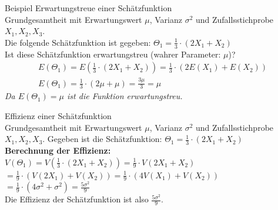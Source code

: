 \begin{example2}{Beispiel Erwartungstreue einer Schätzfunktion}\\
Grundgesamtheit mit Erwartungswert $\mu$, Varianz $\sigma^2$ und Zufallsstichprobe $X_1, X_2, X_3$. \\Die folgende Schätzfunktion ist gegeben:
$
\Theta_1=\frac{1}{3} \cdot(2X_1+X_2)
$\\
Ist diese Schätzfunktion erwartungstreu (wahrer Parameter: $\mu$)?
$$
\begin{gathered}
E(\Theta_1)=E(\frac{1}{3} \cdot(2X_1+X_2))=\frac{1}{3} \cdot(2E(X_1)+E(X_2)) \\
E(\Theta_1)=\frac{1}{3} \cdot(2\mu+\mu)=\frac{3\mu}{3}=\mu
\end{gathered}
$$
\textit{Da $E(\Theta_1)=\mu$ ist die Funktion erwartungstreu.}
\end{example2}

\begin{example2}{Effizienz einer Schätzfunktion}\\
Grundgesamtheit mit Erwartungswert $\mu$, Varianz $\sigma^2$ und Zufallsstichprobe $X_1, X_2, X_3$. Gegeben ist die Schätzfunktion:
$\Theta_1=\frac{1}{3} \cdot(2X_1+X_2)$
\vspace{1mm}\\
\textbf{Berechnung der Effizienz:}
\vspace{1mm}\\
$V(\Theta_1)=V(\frac{1}{3} \cdot(2X_1+X_2))=\frac{1}{9} \cdot V(2X_1+X_2)$\\
$= \frac{1}{9} \cdot (V(2X_1)+V(X_2))=\frac{1}{9} \cdot (4V(X_1)+V(X_2))$\\
$= \frac{1}{9} \cdot (4\sigma^2+\sigma^2)=\frac{5\sigma^2}{9}$
\vspace{1mm}\\
Die Effizienz der Schätzfunktion ist also $\frac{5\sigma^2}{9}$.
\end{example2}

